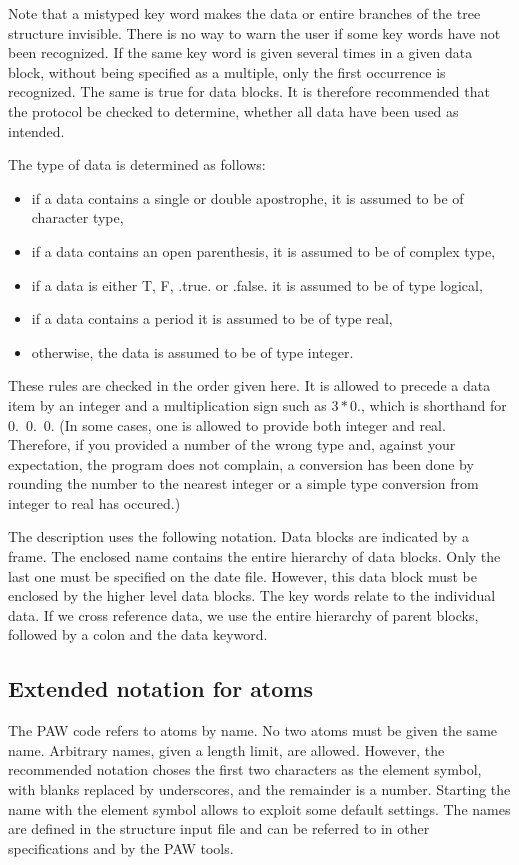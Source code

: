 \documentclass[final,12pt]{article}
\begin{document}
Note that a mistyped key word makes the data or entire branches of the
tree structure invisible. There is no way to warn the user if some key
words have not been recognized.  If the same key word is given several
times in a given data block, without being specified as a multiple,
only the first occurrence is recognized.  The same is true for data
blocks. It is therefore recommended that the protocol be checked to
determine, whether all data have been used as intended.

The type of data is determined as follows:
\begin{itemize}
\item if a data contains a single or double apostrophe, it is
  assumed to be of character type,
\item if a data contains an open parenthesis, it is assumed to be of
  complex type,
\item if a data is either T, F, .true. or .false. it is assumed to be of
  type logical,
\item if a data contains a period it is assumed to be of type real,
\item otherwise, the data is assumed to be of type integer.
\end{itemize}
These rules are checked in the order given here.  It is allowed to
precede a data item by an integer and a multiplication sign such as
$3*0.$, which is shorthand for 0.\ 0.\ 0. (In some cases, one is
allowed to provide both integer and real. Therefore, if you provided a
number of the wrong type and, against your expectation, the program
does not complain, a conversion has been done by rounding the number
to the nearest integer or a simple type conversion from integer to
real has occured.)

The description uses the following notation. Data blocks are
indicated by a frame. The enclosed name contains the entire
hierarchy of data blocks. Only the last one must be specified on the
date file. However, this data block must be enclosed by the higher
level data blocks. The key words relate to the individual data. If we
cross reference data, we use the entire hierarchy of parent
blocks, followed by a colon and the data keyword.

%
\subsection{Extended notation for atoms}
\label{sec:extendedatomnotation}
The PAW code refers to atoms by name. No two atoms must be given the
same name. Arbitrary names, given a length limit, are allowed.
However, the recommended notation choses the first two characters as
the element symbol, with blanks replaced by underscores, and the
remainder is a number. Starting the name with the element symbol
allows to exploit some default settings. The names are defined in the
structure input file and can be referred to in other specifications
and by the PAW tools.
\end{document}
